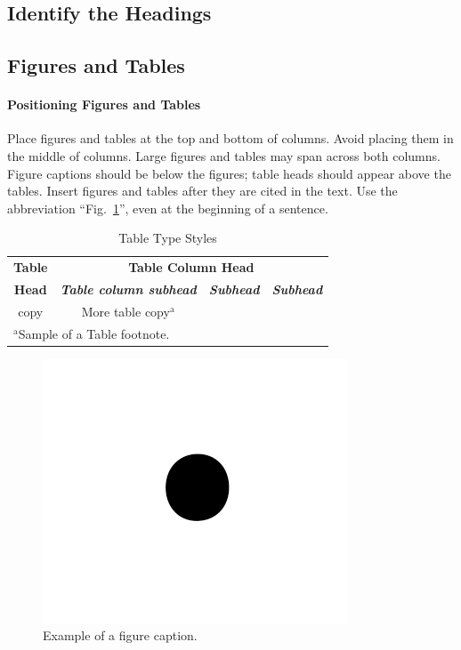 \documentclass[conference]{IEEEtran}
\begin{document}
\subsection{Identify the Headings}

\subsection{Figures and Tables}
\paragraph{Positioning Figures and Tables} Place figures and tables at the top and 
bottom of columns. Avoid placing them in the middle of columns. Large 
figures and tables may span across both columns. Figure captions should be 
below the figures; table heads should appear above the tables. Insert 
figures and tables after they are cited in the text. Use the abbreviation 
``Fig.~\ref{fig}'', even at the beginning of a sentence.

\begin{table}[htbp]
\caption{Table Type Styles}
\begin{center}
\begin{tabular}{|c|c|c|c|}
\hline
\textbf{Table}&\multicolumn{3}{|c|}{\textbf{Table Column Head}} \\
\cline{2-4} 
\textbf{Head} & \textbf{\textit{Table column subhead}}& \textbf{\textit{Subhead}}& \textbf{\textit{Subhead}} \\
\hline
copy& More table copy$^{\mathrm{a}}$& &  \\
\hline
\multicolumn{4}{l}{$^{\mathrm{a}}$Sample of a Table footnote.}
\end{tabular}
\label{tab1}
\end{center}
\end{table}

\begin{figure}[htbp]
\centerline{\includegraphics{fig1.png}}
\caption{Example of a figure caption.}
\label{fig}
\end{figure}
\end{document}

